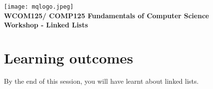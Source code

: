 \usepackage[T1]{fontenc}
\usepackage{pslatex}
\usepackage[pdftex]{color}  
\usepackage[pdftex]{graphicx}     
\usepackage{verbatim}
\usepackage{xcolor}
\usepackage{paralist}
\usepackage[colorlinks=true,urlcolor=red]{hyperref}


\usetikzlibrary{arrows.meta}
\usetikzlibrary{arrows,shapes,snakes,automata,backgrounds,petri}
\newcommand*\circled[1]{\tikz[baseline=(char.base)]{
            \node[shape=circle,draw,inner sep=2pt] (char) {#1};}}
            
\setlength{\topmargin}{-0.5in}                  %
\setlength{\textheight}{9.5in}                  %
\setlength{\oddsidemargin}{0in}                 %
\setlength{\evensidemargin}{0in}                %
\setlength{\textwidth}{6.5in}                   %
\setlength{\parindent}{0.0in}
\newcommand{\code}{\texttt}




%
\vspace{0.2in}
\begin{center}
        {\large  %
\texttt{[image: mqlogo.jpeg]}\\
\medskip
         {\bf WCOM125/ COMP125 Fundamentals of Computer Science\\
        Workshop - Linked Lists\\}}
\end{center}
\vspace{0.3in}
%

\renewcommand{\labelenumi}{\alph{enumi}.}
 
\section* {Learning outcomes}

By the end of this session, you will have learnt about linked lists. 


